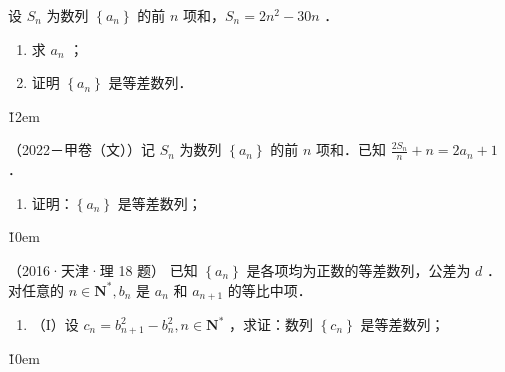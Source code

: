 \begin{example}
    设 $S_n$ 为数列 $\left\{a_n\right\}$ 的前 $n$ 项和，$S_n=2 n^2-30 n$ ．
    \begin{enumerate}
        \item 求 $a_n$ ；

        \item 证明 $\left\{a_n\right\}$ 是等差数列．
    \end{enumerate}
\end{example}

\v{12em}

\begin{example}
    （2022－甲卷（文））记 $S_n$ 为数列 $\left\{a_n\right\}$ 的前 $n$ 项和．已知 $\frac{2 S_n}{n}+n=2 a_n+1$ ．
    \begin{enumerate}
        \item 证明：$\left\{a_n\right\}$ 是等差数列；
    \end{enumerate}
\end{example}

\v{10em}

\begin{example}（2016·天津·理 18 题）
    已知 $\left\{a_n\right\}$ 是各项均为正数的等差数列，公差为 $d$ ．对任意的 $n \in \mathbf{N}^*, b_n$ 是 $a_n$ 和 $a_{n+1}$ 的等比中项．
    \begin{enumerate}
        \item （I）设 $c_n=b_{n+1}^2-b_n^2, n \in \mathbf{N}^*$ ，求证：数列 $\left\{c_n\right\}$ 是等差数列；
    \end{enumerate}
\end{example}

\v{10em}



